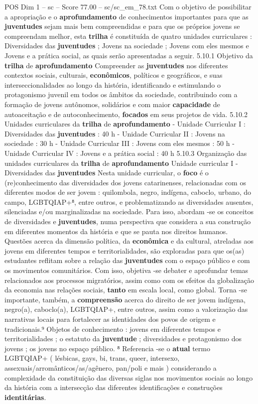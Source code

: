 \begin{textsample}{POS Dim 1 – sc – Score 77.00 – sc/sc\_em\_78.txt}
Com o objetivo de possibilitar a apropriação e o \textbf{aprofundamento} de conhecimentos importantes para que as \textbf{juventudes} sejam mais bem compreendidas e para que os próprios jovens se compreendam melhor, esta \textbf{trilha} é constituída de quatro unidades curriculares : Diversidades das \textbf{juventudes} ; Jovens na sociedade ; Jovens com eles mesmos e Jovens e a prática social, as quais serão apresentadas a seguir. 5.10.1 Objetivo da \textbf{trilha} de \textbf{aprofundamento} Compreender as \textbf{juventudes} nos diferentes contextos sociais, culturais, \textbf{econômicos}, políticos e geográficos, e suas interseccionalidades ao longo da história, identificando e estimulando o protagonismo juvenil em todos os âmbitos da sociedade, contribuindo com a formação de jovens autônomos, solidários e com maior \textbf{capacidade} de autoaceitação e de autoconhecimento, \textbf{focados} em seus projetos de vida. 5.10.2 Unidades curriculares da \textbf{trilha} de \textbf{aprofundamento} - Unidade Curricular I : Diversidades das \textbf{juventudes} : 40 h - Unidade Curricular II : Jovens na sociedade : 30 h - Unidade Curricular III : Jovens com eles mesmos : 50 h - Unidade Curricular IV : Jovens e a prática social : 40 h 5.10.3 Organização das unidades curriculares da \textbf{trilha} de \textbf{aprofundamento} Unidade curricular I - Diversidades das \textbf{juventudes} Nesta unidade curricular, o \textbf{foco} é o (re)conhecimento das diversidades dos jovens catarinenses, relacionadas com os diferentes modos de ser jovem : quilombola, negro, indígena, caboclo, urbano, do campo, LGBTQIAP+⁸, entre outros, e problematizando as diversidades ausentes, silenciadas e/ou marginalizadas na sociedade.
Para isso, abordam -se os conceitos de diversidades e \textbf{juventudes}, numa perspectiva que considera a sua construção em diferentes momentos da história e que se pauta nos direitos humanos.
Questões acerca da dimensão política, da \textbf{econômica} e da cultural, atreladas aos jovens em diferentes tempos e territorialidades, são exploradas para que os(as) estudantes reflitam sobre a relação das \textbf{juventudes} com o espaço público e com os movimentos comunitários.
Com isso, objetiva -se debater e aprofundar temas relacionados aos processos migratórios, assim como com os efeitos da globalização da economia nas relações sociais, \textbf{tanto} em escala local, como global.
Torna -se importante, também, a \textbf{compreensão} acerca do direito de ser jovem indígena, negro(a), caboclo(a), LGBTQIAP+, entre outros, assim como a valorização das narrativas locais para fortalecer as identidades dos povos de origem e tradicionais.⁹ Objetos de conhecimento : jovens em diferentes tempos e territorialidades ; o estatuto da \textbf{juventude} ; diversidades e protagonismo dos jovens ; os jovens no espaço público. ⁸ Referencia -se o \textbf{atual} termo LGBTQIAP+ ( lésbicas, gays, bi, trans, queer, intersexo, assexuais/arromânticos/as/agênero, pan/poli e mais ) considerando a complexidade da constituição das diversas siglas nos movimentos sociais ao longo da história com a intersecção das diferentes identificações e construções \textbf{identitárias}.

\end{textsample}
